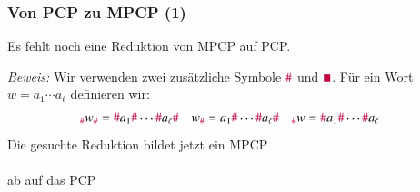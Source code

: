 \documentclass[onlymath]{beamer}
\begin{document}
\begin{frame}[t]\frametitle{Von PCP zu MPCP (1)}

Es fehlt noch eine Reduktion von MPCP auf PCP.\bigskip


\emph{Beweis:} Wir verwenden zwei zusätzliche Symbole $\mathtt{\textcolor{purple}{\#}}$ und 
$\mathtt{\textcolor{purple}{\blacksquare}}$. Für ein Wort $w=a_1\cdots a_\ell$
definieren wir:
\begin{align*}
{}_{\mathtt{\textcolor{purple}{\#}}}w_{\mathtt{\textcolor{purple}{\#}}} &= \mathtt{\textcolor{purple}{\#}}{a_1}\mathtt{\textcolor{purple}{\#}}\cdots\mathtt{\textcolor{purple}{\#}}{a_\ell}\mathtt{\textcolor{purple}{\#}} &
w_{\mathtt{\textcolor{purple}{\#}}} &= {a_1}\mathtt{\textcolor{purple}{\#}}\cdots\mathtt{\textcolor{purple}{\#}}{a_\ell}\mathtt{\textcolor{purple}{\#}} &
{}_{\mathtt{\textcolor{purple}{\#}}}w &= \mathtt{\textcolor{purple}{\#}}{a_1}\mathtt{\textcolor{purple}{\#}}\cdots\mathtt{\textcolor{purple}{\#}}{a_\ell}
\end{align*}
Die gesuchte Reduktion bildet jetzt ein MPCP\\[1ex]
\narrowcentering{$\left[\begin{matrix}x_1\\y_1\end{matrix}\right]\quad\ldots\quad\left[\begin{matrix}x_k\\y_k\end{matrix}\right]$}\\[1ex]
ab auf das PCP\\[1ex]
\\[1ex]


\end{frame}
\end{document}
